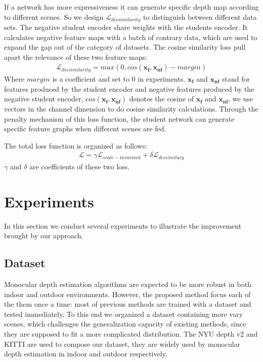 \documentclass{svjour3}                     %
\begin{document}
If a network has more expressiveness 
it can generate specific depth map according
to different scenes. So we design $\mathcal{L}_
{dissimilarity}$ to distinguish
between different data sets.
The negative student encoder share weights 
with the students encoder. It calculates negative feature maps with a batch of
contrary data, which are used to expand the gap out of the category of datasets. 
The cosine similarity loss pull apart the relevance of these two
feature maps: 
\begin{align}
  \mathcal{L}_{dissimilarity}=max(0,cos(\mathbf{x_f}, \mathbf{x_{nf}}) - margin)
\end{align} 
Where $margin$ is a coefficient and set to 0 in experiments. $\mathbf{x_{f}}$ and $\mathbf{x_{nf}}$ stand for features produced by the student encoder and negative features produced by the negative student encoder,
$cos(\mathbf{x_f}, \mathbf{x_{nf}})$ denotes the cosine of $\mathbf{x_{f}}$ and $\mathbf{x_{nf}}$, we use vectors in the channel dimension to do cosine similarity calculations. Through the penalty mechanism of this loss function, the student network can generate specific feature graphs when  different scenes are fed. 

The total loss function is organized as follows:
\begin{align}
\mathcal{L} = \gamma\mathcal{L}_{scale-invariant} + \delta\mathcal{L}_{dissimilary}
\end{align}
 $\gamma$ and $\delta$ are coefficients of these two loss. 

\section{Experiments}
In this section we conduct several experiments to illustrate the improvement
brought by our approach.
\subsection{Dataset}
Monocular depth estimation algorithms are expected to be more robust in both 
indoor and outdoor environments. However, the proposed method focus each of the them
once a time: most of previous methods are trained with a dataset and tested
immediately. To 
this end we organized a dataset containing more vary scenes, which challenges the 
generalization capacity of existing methods, since they are supposed to
fit a more complicated distribution. The NYU depth v2 and KITTI are used to
compose our dataset, they are widely used by monocular depth estimation in indoor
and outdoor respectively.
\end{document}
